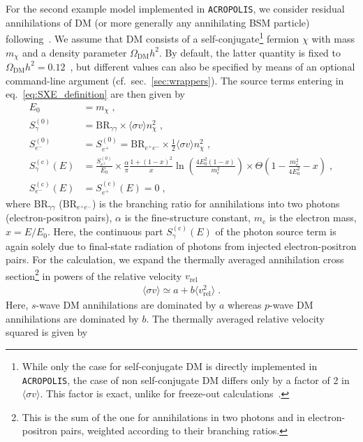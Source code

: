 \documentclass[11pt,a4paper]{article}
\newcommand{\eqsp}{\;}
\begin{document}
For the second example model implemented in \texttt{ACROPOLIS}, we consider residual annihilations of DM (or more generally any annihilating BSM particle) following~\cite{Depta:2019lbe}. We assume that DM consists of a self-conjugate\footnote{While only the case for self-conjugate DM is directly implemented in \texttt{ACROPOLIS}, the case of non self-conjugate DM differs only by a factor of 2 in $\langle \sigma v \rangle$. This factor is exact, unlike for freeze-out calculations~\cite{Bringmann:2020mgx}.} fermion $\chi$ with mass $m_\chi$ and a density parameter $\Omega_\mathrm{DM} h^2$. By default, the latter quantity is fixed to $\Omega_\mathrm{DM} h^2 = 0.12$~\cite{Aghanim:2018eyx}, but different values can also be specified by means of an optional command-line argument (cf.\ sec.~\ref{sec:wrappers}).
The source terms entering in eq.~\eqref{eq:SXE_definition} are then given by~\cite{Depta:2019lbe}
\begin{align}
E_0 &= m_\chi \eqsp, \\
S_\gamma^{(0)} &= \text{BR}_{\gamma \gamma} \times \langle \sigma v \rangle n_\chi^2\eqsp, \\
S_{e^-}^{(0)} &= S_{e^+}^{(0)} = \text{BR}_{e^+ e^-} \times \frac{1}{2} \langle \sigma v \rangle n_\chi^2 \eqsp, \\
S_\gamma^{(\text{c})} (E) &=  \frac{S^{(0)}_{e^\pm}}{E_0} \times \frac{\alpha}{\pi} \frac{1 + (1-x)^2}{x} \ln \left( \frac{4 E_0^2 (1-x)}{m_e^2} \right) \times \Theta \left( 1 - \frac{m_e^2}{4 E_0^2} - x \right)\eqsp, \\
S_{e^-}^{(\text{c})} (E) &= S_{e^+}^{(\text{c})} (E) = 0\eqsp,
\end{align}
where $\text{BR}_{\gamma \gamma}$ ($\text{BR}_{e^+ e^-}$) is the branching ratio for annihilations into two photons (electron-positron pairs), $\alpha$ is the fine-structure constant, $m_e$ is the electron mass, $x = E/E_0$. Here, the continuous part $S_\gamma^{(\text{c})} (E)$ of the photon source term is again solely due to final-state radiation of photons from injected electron-positron pairs. For the calculation, we expand the thermally averaged annihilation cross section\footnote{This is the sum of the one for annihilations in two photons and in electron-positron pairs, weighted according to their branching ratios.} in powers of the relative velocity $v_\mathrm{rel}$
\begin{align}
\langle \sigma v \rangle \simeq a + b \langle v_\mathrm{rel}^2 \rangle\eqsp.
\end{align}
Here, $s$-wave DM annihilations are dominated by $a$ whereas $p$-wave DM annihilations are dominated by $b$. The thermally averaged relative velocity squared is given by
\end{document}
